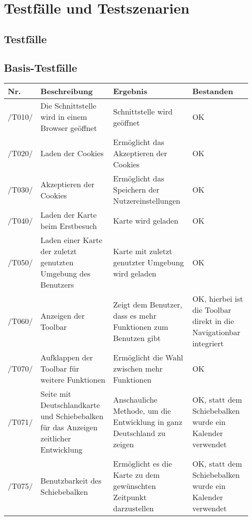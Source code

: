 \section{Testfälle und Testszenarien}
\subsection{Testfälle}


\subsection{Basis-Testfälle}

\begin{tabularx}{\linewidth}{|s| m| m| m|}
	\hline
	\textbf{Nr.} & 
	\textbf{Beschreibung} &
	\textbf{Ergebnis} &
	\textbf{Bestanden}\\
	\hline
	/T010/ & Die Schnittstelle wird in einem Browser geöffnet & Schnittstelle wird geöffnet & OK \\
	\hline
	/T020/ & Laden der \glspl{Cookie} & Ermöglicht das Akzeptieren der \glspl{Cookie} & OK \\
	\hline
	/T030/ & Akzeptieren der \glspl{Cookie} & Ermöglicht das Speichern der Nutzereinstellungen & OK \\
	\hline
	/T040/ & Laden der Karte beim Erstbesuch & Karte wird geladen & OK \\
	\hline
	/T050/ & Laden einer Karte der zuletzt genutzten Umgebung des Benutzers & Karte mit zuletzt genutzter Umgebung wird geladen & OK \\
	\hline
	/T060/ & Anzeigen der \gls{Toolbar} & Zeigt dem Benutzer, dass es mehr Funktionen zum Benutzen gibt & OK, hierbei ist die Toolbar direkt in die Navigationbar integriert\\
	\hline
	/T070/ & Aufklappen der \gls{Toolbar} für weitere Funktionen & Ermöglicht die Wahl zwischen mehr Funktionen & OK \\
	\hline
	/T071/ & Seite mit Deutschlandkarte und Schiebebalken für das Anzeigen zeitlicher Entwicklung & Anschauliche Methode, um die Entwicklung in ganz Deutschland zu zeigen & OK, statt dem Schiebebalken wurde ein Kalender verwendet \\
	\hline
	/T075/ & Benutzbarkeit des Schiebebalken & Ermöglicht es die Karte zu dem gewünschten Zeitpunkt darzustellen & OK, statt dem Schiebebalken wurde ein Kalender verwendet \\

\end{tabularx}
